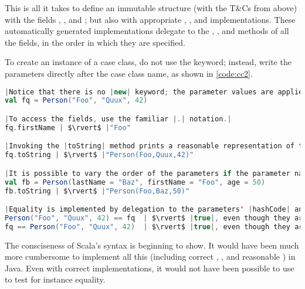 \documentclass[10 pt]{article}
\begin{document}
This is all it takes to define an immutable structure (with the T\&Cs from above) with the fields , , and ; but also with appropriate , , and  implementations. These automatically generated implementations delegate to the , , and  methods of all the fields, in the order in which they are specified.

To create an instance of a case class, do not use the  keyword; instead, write the parameters directly after the case class name, as shown in \autoref{code:cc2}.

\begin{lstlisting}[caption={Using case class \pcode{Person}}, label={code:cc2}, language=Scala, escapechar=|]
|Notice that there is no |new| keyword; the parameter values are applied directly after the case class name.|
val fq = Person("Foo", "Quux", 42)

|To access the fields, use the familiar |.| notation.|
fq.firstName | $\rvert$ |"Foo"

|Invoking the |toString| method prints a reasonable representation of the case class.|
fq.toString | $\rvert$ |"Person(Foo,Quux,42)"

|It is possible to vary the order of the parameters if the parameter names are also specified. This can help readability.|
val fb = Person(lastName = "Baz", firstName = "Foo", age = 50)
fb.toString | $\rvert$ |"Person(Foo,Baz,50)"

|Equality is implemented by delegation to the parameters' |hashCode| and |equals| methods.|
Person("Foo", "Quux", 42) == fq  | $\rvert$ |true|, even though they are \emph{different} instances.|
fq == Person("Foo", "Quux", 42)  | $\rvert$ |true|, even though they are \emph{different} instances.|
\end{lstlisting}

The consciseness of Scala's syntax is beginning to show. It would have been much more cumbersome to implement all this (including correct , , and reasonable ) in Java. Even with correct implementations, it would not have been possible to use \pcode{==} to test for instance equality. 
\end{document}
